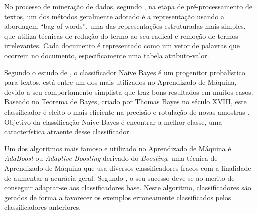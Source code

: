 No processo de mineração de dados, segundo \cite{matsubara2003pretext}, na 
etapa de pré-processamento de textos, um dos métodos geralmente adotado é a 
representação usando a abordagem ``bag-of-words'', uma das representações 
estruturadas mais simples, que utiliza técnicas de redução do termo ao seu 
radical e remoção de termos irrelevantes. Cada documento é  representado como 
um vetor de palavras que ocorrem no documento, especificamente uma tabela 
atributo-valor. 

Segundo o estudo de \cite{de2017mineraccao}, o classificador Naive Bayes é um 
progenitor probalístico para textos, está entre um dos mais utilizados no 
Aprendizado de Máquina, devido a seu comportamento simplista que traz bons 
resultados em muitos casos. Baseado no Teorema de Bayes, criado por Thomas 
Bayes no século XVIII, este classificador é eleito o mais eficiente na precisão 
e rotulação de novas amostras \cite{chakrabarti2002mining}. Objetivo da 
classificação Naive Bayes é encontrar a melhor classe, uma característica 
atraente desse classificador.

Um dos algoritmos mais famoso e utilizado no Aprendizado de Máquina é 
\textit{AdaBoost} ou \textit{Adaptive Boosting} derivado do \textit{Boosting}, 
uma técnica de Aprendizado de Máquina que usa diversos classificadores 
fracos com a finalidade de aumentar a acurácia geral. Segundo 
\cite{dos2015detecccao}, o seu sucesso deve-se ao merito de conseguir 
adaptar-se aos classificadores base. Neste algoritmo, classificadores são 
gerados de forma a favorecer os exemplos erroneamente classificados pelos
classificadores anteriores.






